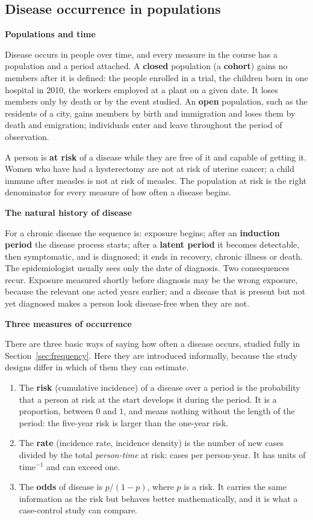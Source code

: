 \documentclass[11pt,a4paper]{article}
\numberwithin{equation}{section}
\theoremstyle{definition}
\newcommand{\subhead}[1]{%
  \par\medskip\noindent\textbf{#1}\par\nobreak\smallskip}
\begin{document}
\subsection{Disease occurrence in populations}
\label{sec:occurrence}

\subhead{Populations and time}

Disease occurs in people over time, and every measure in the course has a population and a period attached. A \textbf{closed} population
(a \textbf{cohort}) gains no members after it is defined: the people enrolled in a trial, the children born in one hospital in 2010, the
workers employed at a plant on a given date. It loses members only by death or by the event studied. An \textbf{open} population, such as
the residents of a city, gains members by birth and immigration and loses them by death and emigration; individuals enter and leave
throughout the period of observation.

A person is \textbf{at risk} of a disease while they are free of it and capable of getting it. Women who have had a hysterectomy are not at
risk of uterine cancer; a child immune after measles is not at risk of measles. The population at risk is the right denominator for every
measure of how often a disease begins.

\subhead{The natural history of disease}

For a chronic disease the sequence is: exposure begins; after an \textbf{induction period} the disease process starts; after a
\textbf{latent period} it becomes detectable, then symptomatic, and is diagnosed; it ends in recovery, chronic illness or death. The
epidemiologist usually sees only the date of diagnosis. Two consequences recur. Exposure measured shortly before diagnosis may be the wrong
exposure, because the relevant one acted years earlier; and a disease that is present but not yet diagnosed makes a person look disease-free
when they are not.

\subhead{Three measures of occurrence}

There are three basic ways of saying how often a disease occurs, studied fully in Section~\ref{sec:frequency}. Here they are introduced
informally, because the study designs differ in which of them they can estimate.

\begin{enumerate}
\item The \textbf{risk} (cumulative incidence) of a disease over a period is the probability that a person at risk at the start develops it
during the period. It is a proportion, between $0$ and $1$, and means nothing without the length of the period: the five-year risk is larger
than the one-year risk.
\item The \textbf{rate} (incidence rate, incidence density) is the number of new cases divided by the total \emph{person-time} at risk:
cases per person-year. It has units of $\text{time}^{-1}$ and can exceed one.
\item The \textbf{odds} of disease is $p/(1-p)$, where $p$ is a risk. It carries the same information as the risk but behaves better
mathematically, and it is what a case-control study can compare.
\end{enumerate}
\end{document}

